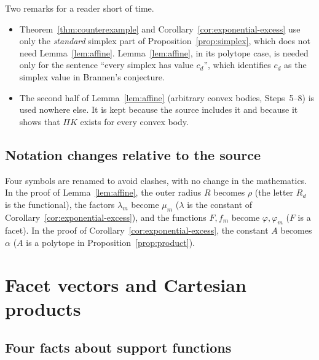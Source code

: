 \documentclass[11pt]{article}
\begin{document}
\noindent Two remarks for a reader short of time.
\begin{itemize}[leftmargin=2em,itemsep=2pt]
\item Theorem~\ref{thm:counterexample} and
 Corollary~\ref{cor:exponential-excess} use only the \emph{standard}
 simplex part of Proposition~\ref{prop:simplex}, which does not need
 Lemma~\ref{lem:affine}. Lemma~\ref{lem:affine}, in its polytope case, is
 needed only for the sentence ``every simplex has value \(c_d\)'', which
 identifies \(c_d\) as the simplex value in Brannen's conjecture.
\item The second half of Lemma~\ref{lem:affine} (arbitrary convex bodies,
 Steps~5--8) is used nowhere else. It is kept because the source includes
 it and because it shows that \(\Pi K\) exists for every convex body.
\end{itemize}

\subsection{Notation changes relative to the source}

Four symbols are renamed to avoid clashes, with no change in the
mathematics. In the proof of Lemma~\ref{lem:affine}, the outer radius \(R\)
becomes \(\rho\) (the letter \(R_d\) is the functional), the factors
\(\lambda_m\) become \(\mu_m\) (\(\lambda\) is the constant of
Corollary~\ref{cor:exponential-excess}), and the functions \(F,f_m\) become
\(\varphi,\varphi_m\) (\(F\) is a facet). In the proof of
Corollary~\ref{cor:exponential-excess}, the constant \(A\) becomes
\(\alpha\) (\(A\) is a polytope in Proposition~\ref{prop:product}).

\section{Facet vectors and Cartesian products}\label{sec:facets}

\subsection{Four facts about support functions}
\end{document}
